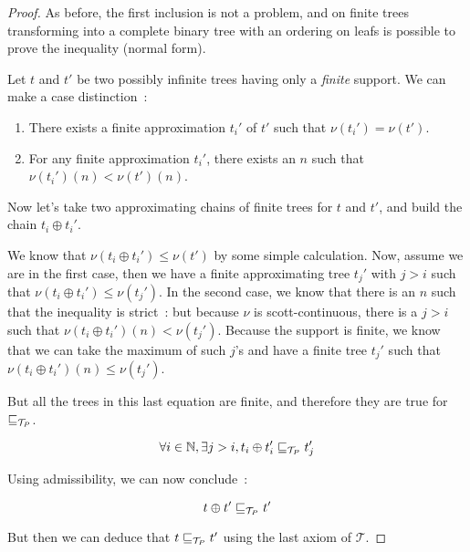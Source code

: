 \begin{proof}
    As before, the first inclusion is not a problem, and on finite 
    trees transforming into a complete binary tree with 
    an ordering on leafs is 
    possible to prove the inequality (normal form).

    Let $t$ and $t'$ be two possibly infinite trees 
    having only a \emph{finite} support. We can make
    a case distinction~:

    \begin{enumerate}
        \item There exists a finite approximation $t_i'$ of $t'$ 
            such that $\nu (t_i') = \nu (t')$.

        \item For any finite approximation $t_i'$, there exists 
            an $n$ such that $\nu (t_i')(n) < \nu (t')(n)$.
    \end{enumerate}

    Now let's take two approximating chains of finite trees 
    for $t$ and $t'$, and build the chain $t_i \oplus t_i'$.
    
    We know that $\nu (t_i \oplus t_i') \leq \nu (t')$ by 
    some simple calculation. Now, assume we are in the first 
    case, then we have a finite approximating tree $t_j'$ with $j > i$ such that 
    $\nu (t_i \oplus t_i') \leq \nu (t_j')$. In the second case,
    we know that there is an $n$ such that the inequality is strict~: 
    but because $\nu$ is scott-continuous, there is a $j > i$ such that 
    $\nu (t_i \oplus t_i') (n) < \nu (t_j')$. Because the support 
    is finite, we know that we can take the maximum of such $j$'s 
    and have a finite tree $t_j'$ such that $\nu (t_i \oplus t_i') (n) \leq \nu
    (t_j')$.

    But all the trees in this last equation are finite, and therefore 
    they are true for $\sqsubseteq_{\mathcal{T}_P}$.

    \begin{equation*}
        \forall i \in \mathbb{N}, \exists j > i, 
        t_i \oplus t_i' \sqsubseteq_{\mathcal{T}_P} t_j'
    \end{equation*}

    Using admissibility, we can now conclude~:

    \begin{equation*}
        t \oplus t' \sqsubseteq_{\mathcal{T}_P} t'
    \end{equation*}

    But then we can deduce that $t \sqsubseteq_{\mathcal{T}_P} t'$ using 
    the last axiom of $\mathcal{T}$.



\end{proof}

